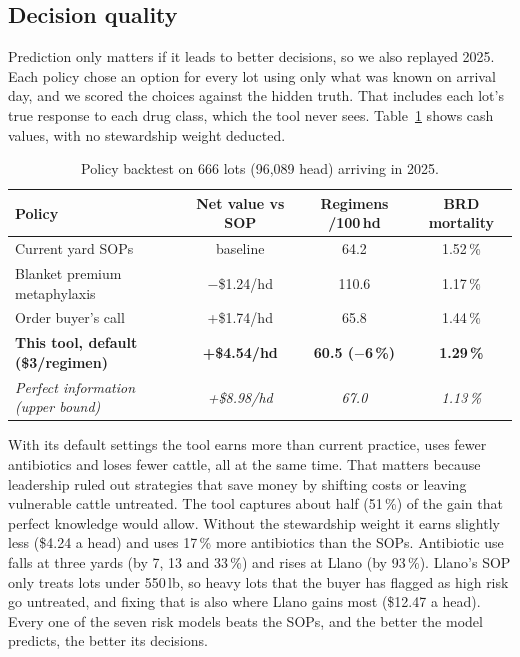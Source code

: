 \documentclass[10pt,letterpaper]{article}
\newcommand{\pct}{\,\%}
\newcommand{\usd}[1]{\$#1}
\begin{document}
\subsection{Decision quality}
Prediction only matters if it leads to better decisions, so we also replayed 2025. Each policy chose an option for every lot using only what was known on arrival day, and we scored the choices against the hidden truth. That includes each lot's true response to each drug class, which the tool never sees. Table~\ref{tab:bt} shows cash values, with no stewardship weight deducted.

\begin{table}[h]
\centering\small
\caption{Policy backtest on 666 lots (96,089 head) arriving in 2025.}\label{tab:bt}
\begin{tabular}{@{}lccc@{}}
\toprule
\textbf{Policy} & \textbf{Net value vs SOP} & \textbf{Regimens /100\,hd} & \textbf{BRD mortality} \\
\midrule
Current yard SOPs & baseline & 64.2 & 1.52\pct \\
Blanket premium metaphylaxis & $-$\usd{1.24}/hd & 110.6 & 1.17\pct \\
Order buyer's call & +\usd{1.74}/hd & 65.8 & 1.44\pct \\
\textbf{This tool, default (\usd{3}/regimen)} & \textbf{+\usd{4.54}/hd} & \textbf{60.5 ($-$6\pct)} & \textbf{1.29\pct} \\
\emph{Perfect information (upper bound)} & \emph{+\usd{8.98}/hd} & \emph{67.0} & \emph{1.13\pct} \\
\bottomrule
\end{tabular}
\end{table}

With its default settings the tool earns more than current practice, uses fewer antibiotics and loses fewer cattle, all at the same time. That matters because leadership ruled out strategies that save money by shifting costs or leaving vulnerable cattle untreated. The tool captures about half (51\pct) of the gain that perfect knowledge would allow. Without the stewardship weight it earns slightly less (\usd{4.24} a head) and uses 17\pct{} more antibiotics than the SOPs. Antibiotic use falls at three yards (by 7, 13 and 33\pct) and rises at Llano (by 93\pct). Llano's SOP only treats lots under 550\,lb, so heavy lots that the buyer has flagged as high risk go untreated, and fixing that is also where Llano gains most (\usd{12.47} a head). Every one of the seven risk models beats the SOPs, and the better the model predicts, the better its decisions.
\end{document}
